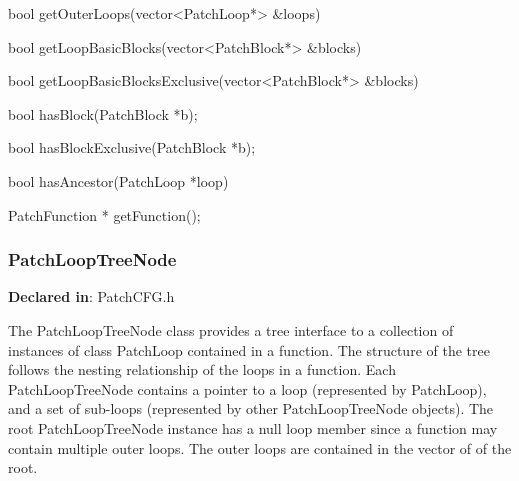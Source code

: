 \begin{apient}
bool getOuterLoops(vector<PatchLoop*> &loops)
\end{apient}

	
\begin{apient}
bool getLoopBasicBlocks(vector<PatchBlock*> &blocks)
\end{apient}

        
\begin{apient}
bool getLoopBasicBlocksExclusive(vector<PatchBlock*> &blocks)
\end{apient}
     
\begin{apient}
bool hasBlock(PatchBlock *b);
\end{apient}

\begin{apient}
bool hasBlockExclusive(PatchBlock *b);
\end{apient}

\begin{apient}
bool hasAncestor(PatchLoop *loop)
\end{apient}

\begin{apient}
PatchFunction * getFunction();
\end{apient}

\subsubsection{PatchLoopTreeNode}
\label{sec-3.2.13}

\textbf{Declared in}: PatchCFG.h

The PatchLoopTreeNode class provides a tree interface to a collection of instances of class 
PatchLoop contained in a function. The structure of the tree 
follows the nesting relationship of the loops in a function. 
Each PatchLoopTreeNode contains a pointer to a loop (represented by PatchLoop), and a set
of sub-loops (represented by other PatchLoopTreeNode objects). The root 
PatchLoopTreeNode instance has a null loop member since a function may contain multiple outer 
loops. The outer loops are contained in the vector of  of the root. 

